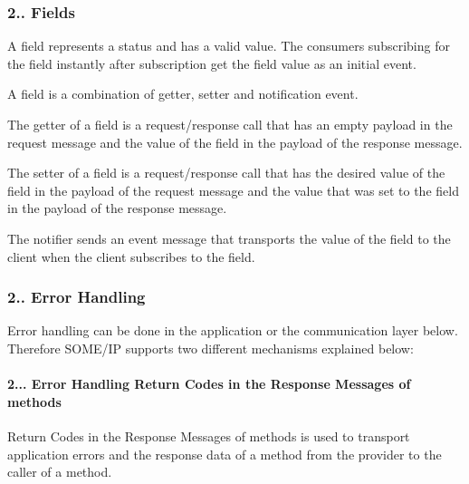 \subsubsection*{2.. Fields}


\begin{DoxyItemize}
\item A field represents a status and has a valid value. The consumers subscribing for the field instantly after subscription get the field value as an initial event. 
\item A field is a combination of getter, setter and notification event.
\item The getter of a field is a request/response call that has an empty payload in the request message and the value of the field in the payload of the response message.
\item The setter of a field is a request/response call that has the desired value of the field in the payload of the request message and the value that was set to the field in the payload of the response message.
\item The notifier sends an event message that transports the value of the field to the client when the client subscribes to the field.
\end{DoxyItemize}

\subsubsection*{2.. Error Handling}


\begin{DoxyItemize}
\item Error handling can be done in the application or the communication layer below. Therefore S\+O\+M\+E/\+IP supports two different mechanisms explained below\+:
\end{DoxyItemize}

\paragraph*{2... Error Handling Return Codes in the Response Messages of methods}


\begin{DoxyItemize}
\item Return Codes in the Response Messages of methods is used to transport application errors and the response data of a method from the provider to the caller of a method.
\end{DoxyItemize}



